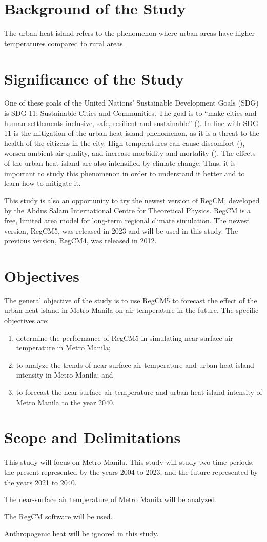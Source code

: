 \section{Background of the Study}
	The urban heat island refers to the phenomenon where urban areas have higher temperatures compared to rural areas.
	
\section{Significance of the Study}
	One of these goals of the United Nations' Sustainable Development Goals (SDG) is SDG 11: Sustainable Cities and Communities.
	The goal is to ``make cities and human settlements inclusive, safe, resilient and sustainable'' (\cite{UN2015}).
	In line with SDG 11 is the mitigation of the urban heat island phenomenon, as it is a threat to the health of the citizens in the city.
	High temperatures can cause discomfort (\cite{Bhati2018}), worsen ambient air quality, and increase morbidity and mortality (\cite {Khan2021}).
	The effects of the urban heat island are also intensified by climate change.
	Thus, it is important to study this phenomenon in order to understand it better and to learn how to mitigate it.
	
	This study is also an opportunity to try the newest version of RegCM, developed by the Abdus Salam International Centre for Theoretical Physics.
	RegCM is a free, limited area model for long-term regional climate simulation.
	The newest version, RegCM5, was released in 2023 and will be used in this study. The previous version, RegCM4, was released in 2012.
	

\section{Objectives}
	The general objective of the study is to use RegCM5 to forecast the effect of the urban heat island in Metro Manila on air temperature in the future.
	The specific objectives are:
	\begin{enumerate}
		\item determine the performance of RegCM5 in simulating near-surface air temperature in Metro Manila;
		\item to analyze the trends of near-surface air temperature and urban heat island intensity in Metro Manila; and
		\item to forecast the near-surface air temperature and urban heat island intensity of Metro Manila to the year 2040.
		
	\end{enumerate}
	

\section{Scope and Delimitations}
	This study will focus on Metro Manila.
	This study will study two time periods: 
		the present represented by the years 2004 to 2023, 
		and the future represented by the years 2021 to 2040.
	
	The near-surface air temperature of Metro Manila will be analyzed.
	
	The RegCM software will be used.
	
	Anthropogenic heat will be ignored in this study. 